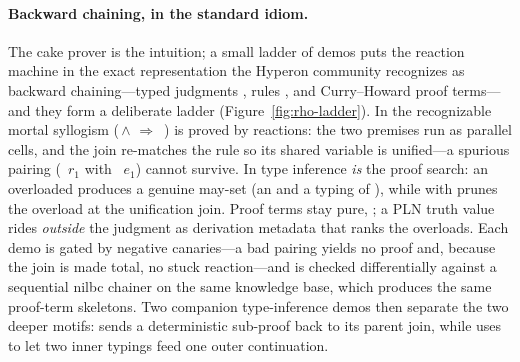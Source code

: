 \paragraph{Backward chaining, in the standard idiom.}  The cake prover is the
intuition; a small ladder of demos puts the reaction machine in the exact
representation the Hyperon community recognizes as backward chaining---typed judgments
, rules , and
Curry--Howard proof terms---and they form a deliberate ladder
(Figure~\ref{fig:rho-ladder}).  In  the recognizable mortal
syllogism (\,$\wedge$\,\,$\Rightarrow$\,%
) is proved by reactions: the two premises run as parallel cells, and
the join re-matches the rule so its shared variable is unified---a spurious pairing
(~$r_1$ with ~$e_1$) cannot survive.  In
 type inference \emph{is} the proof search: an
overloaded  produces a genuine may-set (an  and a 
typing of ), while  with 
prunes the  overload at the unification join.  Proof terms stay pure,
; a PLN truth value rides \emph{outside} the
judgment as derivation metadata that ranks the overloads.  Each demo is gated by
negative canaries---a bad pairing yields no proof and, because the join is made
total, no stuck reaction---and is checked differentially against a sequential nilbc
chainer on the same knowledge base, which produces the same proof-term skeletons.
Two companion type-inference demos then separate the two deeper motifs:
 sends a deterministic sub-proof back to its
parent join, while  uses
 to let two inner typings feed one outer continuation.

